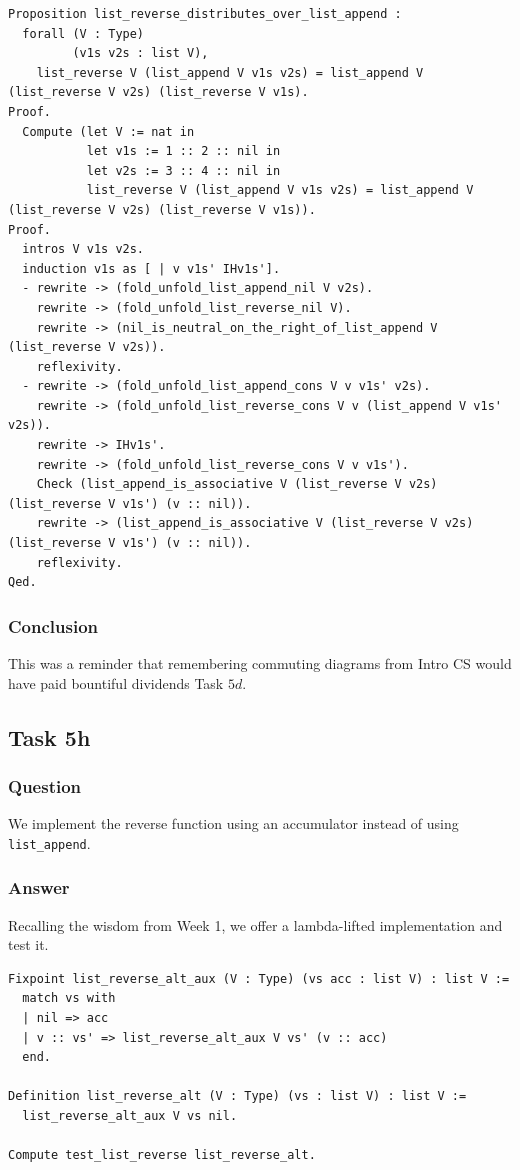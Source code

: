 \documentclass{article}
\begin{document}
\begin{lstlisting}
Proposition list_reverse_distributes_over_list_append :
  forall (V : Type)
         (v1s v2s : list V),
    list_reverse V (list_append V v1s v2s) = list_append V (list_reverse V v2s) (list_reverse V v1s).
Proof.
  Compute (let V := nat in
           let v1s := 1 :: 2 :: nil in
           let v2s := 3 :: 4 :: nil in
           list_reverse V (list_append V v1s v2s) = list_append V (list_reverse V v2s) (list_reverse V v1s)).
Proof.
  intros V v1s v2s.
  induction v1s as [ | v v1s' IHv1s'].
  - rewrite -> (fold_unfold_list_append_nil V v2s).  
    rewrite -> (fold_unfold_list_reverse_nil V).
    rewrite -> (nil_is_neutral_on_the_right_of_list_append V (list_reverse V v2s)).
    reflexivity.
  - rewrite -> (fold_unfold_list_append_cons V v v1s' v2s).
    rewrite -> (fold_unfold_list_reverse_cons V v (list_append V v1s' v2s)).
    rewrite -> IHv1s'.
    rewrite -> (fold_unfold_list_reverse_cons V v v1s').
    Check (list_append_is_associative V (list_reverse V v2s)(list_reverse V v1s') (v :: nil)). 
    rewrite -> (list_append_is_associative V (list_reverse V v2s)(list_reverse V v1s') (v :: nil)).
    reflexivity.
Qed.   
\end{lstlisting}

\subsubsection{Conclusion}
This was a reminder that remembering commuting diagrams from Intro CS would have paid bountiful dividends Task $5d$.

\subsection{Task 5h}

\subsubsection{Question}
We implement the reverse function using an accumulator instead of using \texttt{list\_append}.

\subsubsection{Answer}
Recalling the wisdom from Week 1, we offer a lambda-lifted implementation and test it.

\begin{lstlisting}
Fixpoint list_reverse_alt_aux (V : Type) (vs acc : list V) : list V :=
  match vs with
  | nil => acc
  | v :: vs' => list_reverse_alt_aux V vs' (v :: acc)
  end.

Definition list_reverse_alt (V : Type) (vs : list V) : list V :=
  list_reverse_alt_aux V vs nil.

Compute test_list_reverse list_reverse_alt.
\end{lstlisting}
\end{document}
